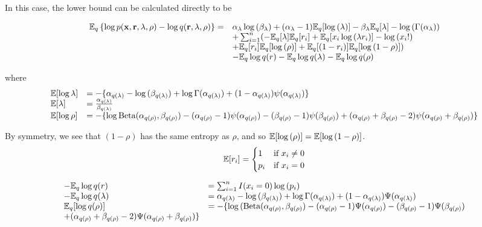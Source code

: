 \documentclass{amsart}
\begin{document}
In this case, the lower bound can be calculated directly to be

$$
\begin{array}{ll}
{\mathbb E}_q \left\{ \log{p({\bf x}, {\bf r}, \lambda, \rho)} - \log{q({\bf r}, \lambda, \rho)} \right\} =& 
\alpha_\lambda \log{(\beta_\lambda)} + (\alpha_\lambda - 1) {\mathbb E}_q[\log{(\lambda)}] - \beta_\lambda {\mathbb E}_q [\lambda] - \log{(\Gamma(\alpha_\lambda))} \\
&+ \sum_{i=1}^n ( -{\mathbb E}_q [\lambda] {\mathbb E}_q [r_i] + {\mathbb E}_q[x_i \log{(\lambda r_i)}] - \log{(x_i!)} \\
&+ {\mathbb E}_q[r_i] {\mathbb E}_q[\log{(\rho)}] + {\mathbb E}_q[(1 - r_i)] {\mathbb E}_q[\log{(1 - \rho)}] ) \\
& - {\mathbb E}_q \log{q(r)} - {\mathbb E}_q \log{q(\lambda)} - {\mathbb E}_q \log{q(\rho)}
\end{array}
$$

where
$$
\begin{array}{ll}
{\mathbb E} [\log{\lambda}] &= -\{ \alpha_{q(\lambda)} - \log{(\beta_{q(\lambda)})} + \log{\Gamma(\alpha_{q(\lambda)})} + (1 - \alpha_{q(\lambda)}) \psi{(\alpha_{q(\lambda)})} \} \\
{\mathbb E} [\lambda] &= \frac{\alpha_{q(\lambda)}}{\beta_{q(\lambda)}} \\
{\mathbb E}[\log{\rho}] &= - \{ \log{\text{Beta}(\alpha_{q(\rho)}, \beta_{q(\rho)})} - (\alpha_{q(\rho)} - 1) \psi{(\alpha_{q(\rho)})} - (\beta_{q(\rho)} - 1)\psi{(\beta_{q(\rho)})} + (\alpha_{q(\rho)} + \beta_{q(\rho)} - 2)\psi{(\alpha_{q(\rho)} + \beta_{q(\rho)})} \} \\
\end{array}
$$

By symmetry, we see that $(1 - \rho)$ has the same entropy as $\rho$,
and so ${\mathbb E} [\log{(\rho)}] = {\mathbb E} [\log{(1 - \rho)}]$.
$$
{\mathbb E}[r_i] = 
	\begin{cases}
	1 & \text{if } x_i \ne 0 \\
	p_i & \text{if } x_i = 0 \\
	\end{cases}
$$

$$
\begin{array}{ll}
-{\mathbb E}_q \log{q(r)} &= \sum_{i=1}^n I(x_i = 0) \log{(p_i)} \\
-{\mathbb E}_q \log{q(\lambda)} &= \alpha_{q(\lambda)} - \log{(\beta_{q(\lambda)})} + \log{\Gamma{(\alpha_{q(\lambda)})}} + (1 - \alpha_{q(\lambda)}) \Psi{(\alpha_{q(\lambda)})} \\
{\mathbb E}_q[\log{q(\rho)}] &= - \{ \log{(\text{Beta}(\alpha_{q(\rho)}, \beta_{q(\rho)})} - (\alpha_{q(\rho)} - 1) \Psi{(\alpha_{q(\rho)})} - (\beta_{q(\rho)} - 1)\Psi{(\beta_{q(\rho)})} \\
+ (\alpha_{q(\rho)} + \beta_{q(\rho)} - 2)\Psi{(\alpha_{q(\rho)} + \beta_{q(\rho)})} \} \\
\end{array}
$$
\end{document}
